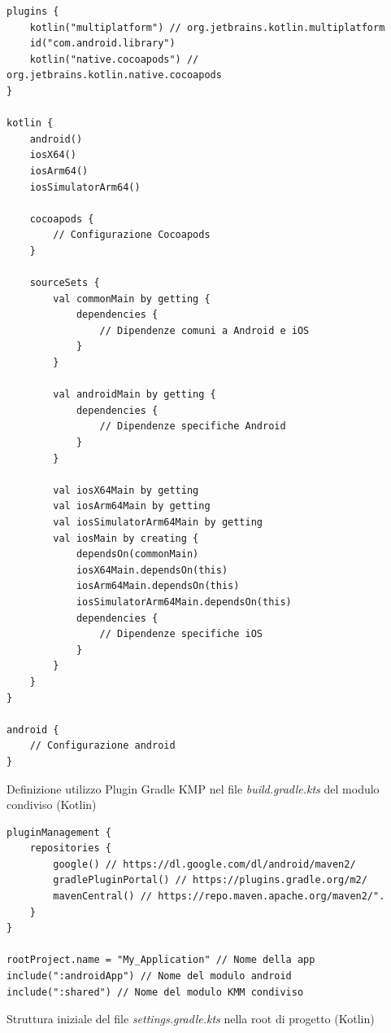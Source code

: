 \begin{listing}[H]
\begin{verbatim}
plugins {
    kotlin("multiplatform") // org.jetbrains.kotlin.multiplatform
    id("com.android.library")
    kotlin("native.cocoapods") // org.jetbrains.kotlin.native.cocoapods
}

kotlin {
    android()
    iosX64()
    iosArm64()
    iosSimulatorArm64()
    
    cocoapods {
        // Configurazione Cocoapods
    }
    
    sourceSets {
        val commonMain by getting {
            dependencies {
                // Dipendenze comuni a Android e iOS
            }
        }

        val androidMain by getting {
            dependencies {
                // Dipendenze specifiche Android
            }
        }

        val iosX64Main by getting
        val iosArm64Main by getting
        val iosSimulatorArm64Main by getting
        val iosMain by creating {
            dependsOn(commonMain)
            iosX64Main.dependsOn(this)
            iosArm64Main.dependsOn(this)
            iosSimulatorArm64Main.dependsOn(this)
            dependencies {
                // Dipendenze specifiche iOS
            }
        }
    }
}

android {
    // Configurazione android 
}
\end{verbatim}
\caption{Definizione utilizzo Plugin Gradle KMP nel file \textit{build.gradle.kts} del modulo condiviso (Kotlin)}
\end{listing}

\begin{listing}[H]
\begin{verbatim}
pluginManagement {
    repositories {
        google() // https://dl.google.com/dl/android/maven2/
        gradlePluginPortal() // https://plugins.gradle.org/m2/
        mavenCentral() // https://repo.maven.apache.org/maven2/".
    }
}

rootProject.name = "My_Application" // Nome della app
include(":androidApp") // Nome del modulo android
include(":shared") // Nome del modulo KMM condiviso
\end{verbatim}
\caption{Struttura iniziale del file \textit{settings.gradle.kts} nella root di progetto (Kotlin)}
\end{listing}

